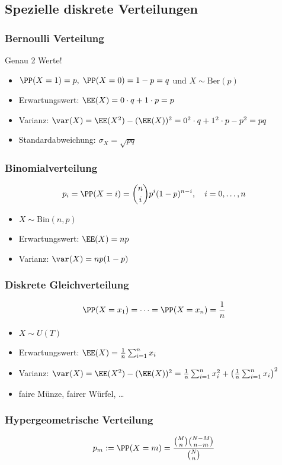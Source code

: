 \subsection{Spezielle diskrete Verteilungen}
\subsubsection{Bernoulli Verteilung}
Genau 2 Werte!
\begin{itemize}
\item $\PP(X=1)=p, \; \PP(X=0)=1-p=q$ und $X \sim \mathrm{Ber}(p)$
\item Erwartungswert: $\EE(X)=0\cdot q + 1 \cdot p = p$
\item Varianz: $\var (X) = \EE(X^2) - (\EE(X))^2 = 0^2 \cdot q + 1^2 \cdot p - p^2 = pq$
\item Standardabweichung: $\sigma_X=\sqrt{pq}$
\end{itemize}
\subsubsection{Binomialverteilung}
$$p_i=\PP(X=i)=\binom{n}{i}p^i (1-p)^{n-i}, \quad i=0,\dots ,n$$
\begin{itemize}
\item $X \sim \mathrm{Bin}(n,p)$
\item Erwartungswert: $\EE(X)=np$
\item Varianz: $\var (X) = np (1-p)$
\end{itemize}

\subsubsection{Diskrete Gleichverteilung}

$$\PP(X=x_1) = \dots = \PP(X=x_n) = \frac{1}{n}$$

\begin{itemize}
\item $X\sim U(T)$
\item Erwartungswert: $\EE(X)=\frac{1}{n}\sum_{i=1}^n x_i$
\item Varianz: $\var(X)=\EE(X^2)-(\EE(X))^2 = \frac{1}{n} \sum_{i=1}^n x_i^2+\left(\frac{1}{n}\sum_{i=1}^n x_i\right)^2$
\item faire Münze, fairer Würfel, …
\end{itemize}

\subsubsection{Hypergeometrische Verteilung}
$$p_m:=\PP(X=m)=\frac{\binom{M}{n}\binom{N-M}{n-m}}{\binom{N}{n}}$$

